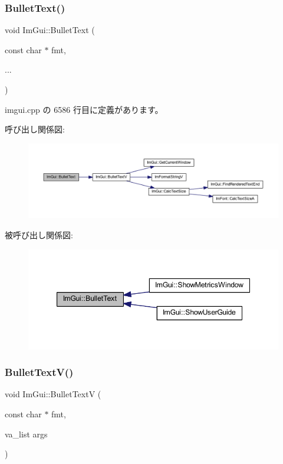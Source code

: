 \subsubsection{\texorpdfstring{Bullet\+Text()}{BulletText()}}
{\footnotesize\ttfamily void Im\+Gui\+::\+Bullet\+Text (\begin{DoxyParamCaption}\item[{const char $\ast$}]{fmt,  }\item[{}]{... }\end{DoxyParamCaption})}



 imgui.\+cpp の 6586 行目に定義があります。

呼び出し関係図\+:\nopagebreak
\begin{figure}[H]
\begin{center}
\leavevmode
\includegraphics[width=350pt]{namespace_im_gui_af8d34d563b17c683943a0fa7bf5807bc_cgraph}
\end{center}
\end{figure}
被呼び出し関係図\+:\nopagebreak
\begin{figure}[H]
\begin{center}
\leavevmode
\includegraphics[width=347pt]{namespace_im_gui_af8d34d563b17c683943a0fa7bf5807bc_icgraph}
\end{center}
\end{figure}
\mbox{\label{namespace_im_gui_af8f4b5e96c745e205974857f9a584583}} 
\subsubsection{\texorpdfstring{Bullet\+Text\+V()}{BulletTextV()}}
{\footnotesize\ttfamily void Im\+Gui\+::\+Bullet\+TextV (\begin{DoxyParamCaption}\item[{const char $\ast$}]{fmt,  }\item[{va\+\_\+list}]{args }\end{DoxyParamCaption})}



